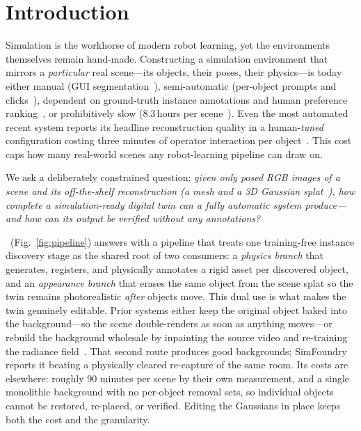\section{Introduction}

Simulation is the workhorse of modern robot learning, yet the
environments themselves remain hand-made. Constructing a simulation
environment that mirrors a \emph{particular} real scene---its objects,
their poses, their physics---is today either manual
(GUI segmentation~\cite{rialto}), semi-automatic (per-object prompts and
clicks~\cite{gase}), dependent on ground-truth instance annotations and
human preference ranking~\cite{metascenes}, or prohibitively slow
(8.3\,hours per scene~\cite{holoscene}). Even the most automated recent
system reports its headline reconstruction quality in a
human-\emph{tuned} configuration costing three minutes of operator
interaction per object~\cite{simfoundry}. This cost caps how many
real-world scenes any robot-learning pipeline can draw on.

We ask a deliberately constrained question: \emph{given only posed RGB
images of a scene and its off-the-shelf reconstruction (a mesh and a 3D
Gaussian splat~\cite{3dgs}), how complete a simulation-ready digital twin
can a fully automatic system produce---and how can its output be verified
without any annotations?}

\name\ (Fig.~\ref{fig:pipeline}) answers with a pipeline that treats one
training-free instance discovery stage as the shared root of two
consumers: a \emph{physics branch} that generates, registers, and
physically annotates a rigid asset per discovered object, and an
\emph{appearance branch} that erases the same object from the scene splat
so the twin remains photorealistic \emph{after} objects move. This dual
use is what makes the twin genuinely editable. Prior systems either keep
the original object baked into the background---so the scene
double-renders as soon as anything moves---or rebuild the background
wholesale by inpainting the source video and re-training the radiance
field~\cite{simfoundry,wanda}. That second route produces good
backgrounds; SimFoundry reports it beating a physically cleared re-capture
of the same room. Its costs are elsewhere: roughly 90 minutes per scene by
their own measurement, and a single monolithic background with no
per-object removal sets, so individual objects cannot be restored,
re-placed, or verified. Editing the Gaussians in place keeps both the cost
and the granularity.

